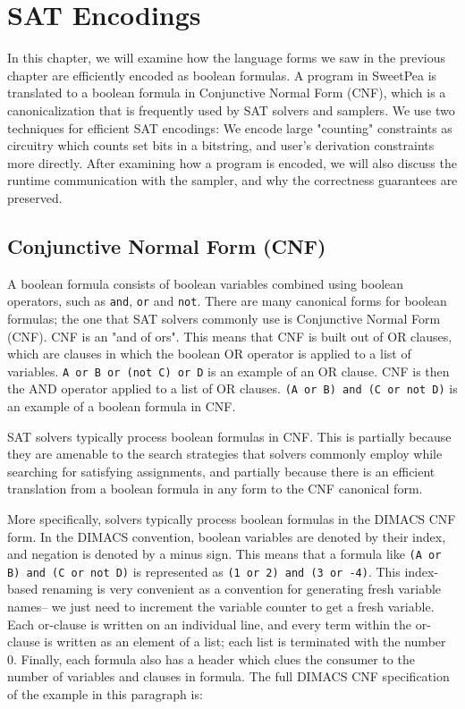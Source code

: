 
\chapter{SAT Encodings}

In this chapter, we will examine how the language forms we saw in the previous chapter are efficiently encoded as boolean formulas. A program in SweetPea is translated to a boolean formula in Conjunctive Normal Form (CNF), which is a canonicalization that is frequently used by SAT solvers and samplers. We use two techniques for efficient SAT encodings: We encode large "counting" constraints as circuitry which counts set bits in a bitstring, and user's derivation constraints more directly. After examining how a program is encoded, we will also discuss the runtime communication with the sampler, and why the correctness guarantees are preserved.

\section{Conjunctive Normal Form (CNF)}

A boolean formula consists of boolean variables combined using boolean operators, such as \texttt{and}, \texttt{or} and \texttt{not}. There are many canonical forms for boolean formulas; the one that SAT solvers commonly use is Conjunctive Normal Form (CNF). CNF is an "and of ors". This means that CNF is built out of OR clauses, which are clauses in which the boolean OR operator is applied to a list of variables. \texttt{A or B or (not C) or D} is an example of an OR clause. CNF is then the AND operator applied to a list of OR clauses. \texttt{(A or B) and (C or not D)} is an example of a boolean formula in CNF.

SAT solvers typically process boolean formulas in CNF. This is partially because they are amenable to the search strategies that solvers commonly employ while searching for satisfying assignments, and partially because there is an efficient translation from a boolean formula in any form to the CNF canonical form.

More specifically, solvers typically process boolean formulas in the DIMACS CNF form. In the DIMACS convention, boolean variables are denoted by their index, and negation is denoted by a minus sign. This means that a formula like \texttt{(A or B) and (C or not D)} is represented as \texttt{(1 or 2) and (3 or -4)}. This index-based renaming is very convenient as a convention for generating fresh variable names-- we just need to increment the variable counter to get a fresh variable. Each or-clause is written on an individual line, and every term within the or-clause is written as an element of a list; each list is terminated with the number 0. Finally, each formula also has a header which clues the consumer to the number of variables and clauses in formula. The full DIMACS CNF specification of the example in this paragraph is:


